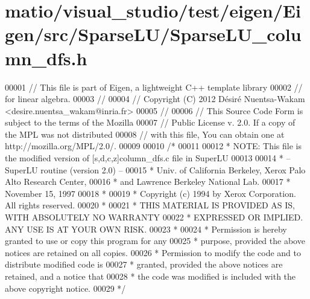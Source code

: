 \hypertarget{matio_2visual__studio_2test_2eigen_2_eigen_2src_2_sparse_l_u_2_sparse_l_u__column__dfs_8h_source}{}\section{matio/visual\+\_\+studio/test/eigen/\+Eigen/src/\+Sparse\+L\+U/\+Sparse\+L\+U\+\_\+column\+\_\+dfs.h}
\label{matio_2visual__studio_2test_2eigen_2_eigen_2src_2_sparse_l_u_2_sparse_l_u__column__dfs_8h_source}

\begin{DoxyCode}
00001 \textcolor{comment}{// This file is part of Eigen, a lightweight C++ template library}
00002 \textcolor{comment}{// for linear algebra.}
00003 \textcolor{comment}{//}
00004 \textcolor{comment}{// Copyright (C) 2012 Désiré Nuentsa-Wakam <desire.nuentsa\_wakam@inria.fr>}
00005 \textcolor{comment}{//}
00006 \textcolor{comment}{// This Source Code Form is subject to the terms of the Mozilla}
00007 \textcolor{comment}{// Public License v. 2.0. If a copy of the MPL was not distributed}
00008 \textcolor{comment}{// with this file, You can obtain one at http://mozilla.org/MPL/2.0/.}
00009 
00010 \textcolor{comment}{/* }
00011 \textcolor{comment}{ }
00012 \textcolor{comment}{ * NOTE: This file is the modified version of [s,d,c,z]column\_dfs.c file in SuperLU }
00013 \textcolor{comment}{ }
00014 \textcolor{comment}{ * -- SuperLU routine (version 2.0) --}
00015 \textcolor{comment}{ * Univ. of California Berkeley, Xerox Palo Alto Research Center,}
00016 \textcolor{comment}{ * and Lawrence Berkeley National Lab.}
00017 \textcolor{comment}{ * November 15, 1997}
00018 \textcolor{comment}{ *}
00019 \textcolor{comment}{ * Copyright (c) 1994 by Xerox Corporation.  All rights reserved.}
00020 \textcolor{comment}{ *}
00021 \textcolor{comment}{ * THIS MATERIAL IS PROVIDED AS IS, WITH ABSOLUTELY NO WARRANTY}
00022 \textcolor{comment}{ * EXPRESSED OR IMPLIED.  ANY USE IS AT YOUR OWN RISK.}
00023 \textcolor{comment}{ *}
00024 \textcolor{comment}{ * Permission is hereby granted to use or copy this program for any}
00025 \textcolor{comment}{ * purpose, provided the above notices are retained on all copies.}
00026 \textcolor{comment}{ * Permission to modify the code and to distribute modified code is}
00027 \textcolor{comment}{ * granted, provided the above notices are retained, and a notice that}
00028 \textcolor{comment}{ * the code was modified is included with the above copyright notice.}
00029 \textcolor{comment}{ */}

\end{DoxyCode}
